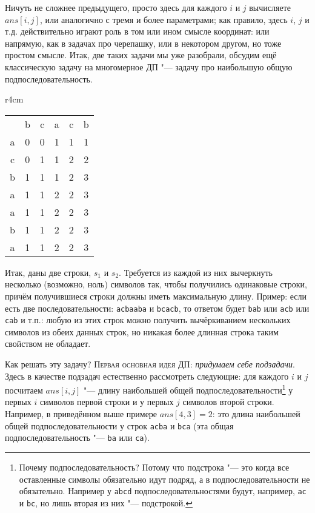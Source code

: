  Ничуть не сложнее предыдущего, просто здесь для каждого $i$ и $j$ 
вычисляете $ans[i,j]$, или аналогично с тремя и более параметрами; как правило, здесь $i$, $j$ и 
т.д. действительно играют роль в том или ином смысле координат: или напрямую, как в задачах про 
черепашку, или в некотором другом, но тоже простом смысле. Итак, две таких задачи мы уже разобрали, 
обсудим ещё классическую задачу на многомерное ДП "--- задачу про наибольшую общую 
подпоследовательность.

\begin{wrapfigure}{r}{4cm}
\begin{tabular}{cccccc}
~&b&c&a&c&b\\
a&0&0&1&1&1\\
c&0&1&1&2&2\\
b&1&1&1&2&3\\
a&1&1&2&2&3\\
a&1&1&2&2&3\\
b&1&1&2&2&3\\
a&1&1&2&2&3
\end{tabular}
\end{wrapfigure}

Итак, даны две строки, $s_1$ и $s_2$. Требуется из каждой из них вычеркнуть несколько 
(возможно, ноль) символов так, чтобы получились одинаковые строки, причём получившиеся строки 
должны иметь максимальную длину. Пример: если есть две последовательности: \verb|acbaaba| и 
\verb|bcacb|, то ответом будет \verb|bab| или \verb|acb| или \verb|cab| и т.п.: любую из этих строк 
можно получить вычёркиванием нескольких символов из обеих данных строк, но никакая более длинная 
строка таким свойством не обладает.

Как решать эту задачу? \textsc{Первая основная идея ДП:} \textit{придумаем себе подзадачи}. Здесь в качестве 
подзадач естественно рассмотреть следующие: для каждого $i$ и $j$ посчитаем $ans[i,j]$ "--- длину 
наибольшей общей подпоследовательности\footnote{%
Почему подпоследовательность? Потому что подстрока "--- это когда все оставленные символы 
обязательно идут подряд, а в подпоследовательности не обязательно. Например у \texttt{abcd}
подпоследовательностями будут, например, \texttt{ac} и \texttt{bc}, но лишь вторая из них "--- 
подстрокой.}
 у первых $i$ символов первой строки и у первых $j$ символов 
второй строки. Например, в приведённом выше примере $ans[4,3]=2$: это длина наибольшей общей 
подпоследовательности у строк \verb|acba| и \verb|bca| (эта общая подпоследовательность "--- 
\verb|ba| или \verb|ca|). 

